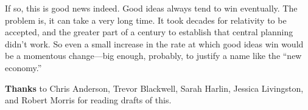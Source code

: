 \documentclass[12pt]{book}
\begin{document}
If so, this is good news indeed. Good ideas always tend to win
eventually. The problem is, it can take a very long time. It took
decades for relativity to be accepted, and the greater part of a century
to establish that central planning didn't work. So even a small increase
in the rate at which good ideas win would be a momentous change---big
enough, probably, to justify a name like the ``new economy.''


\textbf{Thanks} to Chris Anderson, Trevor Blackwell, Sarah Harlin,
Jessica Livingston, and Robert Morris for reading drafts of this.
\end{document}
